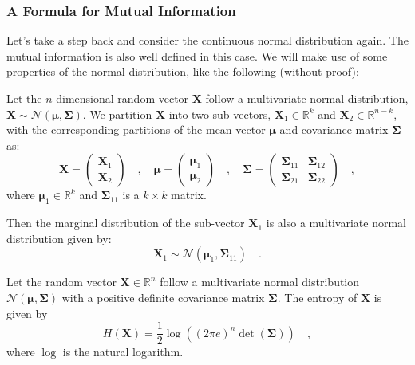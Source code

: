 \documentclass[../../main.tex]{subfiles}
\begin{document}
\subsubsection{A Formula for Mutual Information}
Let's take a step back and consider the continuous normal distribution again. The mutual information is also well defined in this case. We will make use of some properties of the normal distribution, like the following (without proof):

\pagebreak
\begin{proposition}
    Let the $n$-dimensional random vector $\bm{X}$ follow a multivariate normal distribution, $\bm{X} \sim \mathcal{N}(\bm{\mu}, \bm{\Sigma})$. We partition $\bm{X}$ into two sub-vectors, $\bm{X}_1 \in \mathbb{R}^k$ and $\bm{X}_2 \in \mathbb{R}^{n-k}$, with the corresponding partitions of the mean vector $\bm{\mu}$ and covariance matrix $\bm{\Sigma}$ as:
    \[
        \bm{X} = \begin{pmatrix} \bm{X}_1 \\ \bm{X}_2 \end{pmatrix} \quad , \quad 
        \bm{\mu} = \begin{pmatrix} \bm{\mu}_1 \\ \bm{\mu}_2 \end{pmatrix} \quad , \quad 
        \bm{\Sigma} = \begin{pmatrix} \bm{\Sigma}_{11} & \bm{\Sigma}_{12} \\ \bm{\Sigma}_{21} & \bm{\Sigma}_{22} \end{pmatrix} \quad ,
    \]
    where $\bm{\mu}_1 \in \mathbb{R}^k$ and $\bm{\Sigma}_{11}$ is a $k \times k$ matrix.
    
    Then the marginal distribution of the sub-vector $\bm{X}_1$ is also a multivariate normal distribution given by:
    \[
        \bm{X}_1 \sim \mathcal{N}(\bm{\mu}_1, \bm{\Sigma}_{11}) \quad .
    \]
\end{proposition}

\begin{proposition}
    Let the random vector $\bm{X} \in \mathbb{R}^n$ follow a multivariate normal distribution $\mathcal{N}(\bm{\mu}, \bm{\Sigma})$ with a positive definite covariance matrix $\bm{\Sigma}$. The entropy of $\bm{X}$ is given by
    \[
        H(\bm{X}) = \frac{1}{2} \log\left( (2\pi e)^n \det(\bm{\Sigma}) \right) \quad,
    \]
    where $\log$ is the natural logarithm.
\end{proposition}
\end{document}
